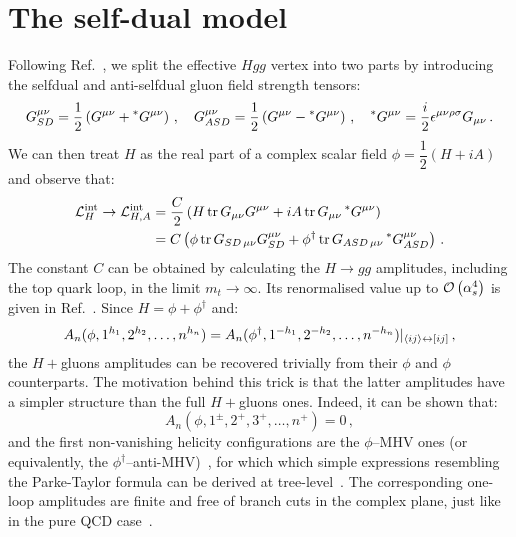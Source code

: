 \documentclass[main.tex]{subfiles}
\begin{document}
\section{The self-dual model}
Following Ref.~\cite{Dixon:2004za}, we split the effective $Hgg$ vertex into two parts by introducing the selfdual and anti-selfdual gluon field strength tensors:
\begin{equation}
    G^{\mu\nu}_{SD} = \frac{1}{2} \left(G^{\mu\nu} + \prescript{\ast}{}{G}^{\mu\nu} \right)\,, \quad     G^{\mu\nu}_{ASD} = \frac{1}{2} \left(G^{\mu\nu} - \prescript{\ast}{}{G}^{\mu\nu} \right)\,, \quad\prescript{\ast}{}{G}^{\mu\nu} = \frac{i}{2} \epsilon^{\mu\nu\rho\sigma} G_{\mu\nu}\,.
\end{equation}
We can then treat $H$ as the real part of a complex scalar field $\phi = \dfrac{1}{2}(H+i A)$ and observe that:
\begin{align}
    \mathcal{L}_H^{\text{int}} \rightarrow \mathcal{L}_{H, A}^{\text{int}} &= \frac{C}{2} \left( H \operatorname{\rm tr} {G}_{\mu\nu}{G}^{\mu\nu} + iA \operatorname{\rm tr} {G}_{\mu\nu}\prescript{\ast}{}{G}^{\mu\nu}\right) \\
    &= C \left( \phi \operatorname{\rm tr} {G}_{SD\,\mu\nu}{G}_{SD}^{\mu\nu} + \phi^\dagger \operatorname{\rm tr} {G}_{ASD\,\mu\nu}\prescript{\ast}{}{G}_{ASD}^{\mu\nu}\right)\,.
\end{align} 
The constant $C$ can be obtained by calculating the $H \rightarrow gg$ amplitudes, including the top quark loop, in the limit $m_t \rightarrow \infty$. Its renormalised value up to $\mathcal{O}\left(\alpha_s^4\right)$ is given in Ref.~\cite{Chetyrkin:1997iv}. Since $H = \phi + \phi^\dagger$ and:
\begin{equation}
    A_n(\phi, 1^{h_1},2^{h_2}, \ldots, n^{h_n}) = A_n(\phi^\dagger, 1^{-h_1},2^{-h_2}, \ldots, n^{-h_n}) \rvert_{\langle ij\rangle \leftrightarrow [ij]} \,,
\end{equation}
the $H+$gluons amplitudes can be recovered trivially from their $\phi$ and $\phi$ counterparts. The motivation behind this trick is that the latter amplitudes have a simpler structure than the full $H+$gluons ones. Indeed, it can be shown that: 
\begin{equation}
    A_n(\phi, 1^\pm,2^+,3^+, \ldots, n^+) = 0 \,,
\end{equation}
and the first non-vanishing helicity configurations are the $\phi$--MHV ones (or equivalently, the $\phi^\dagger$--anti-MHV)~\cite{Berends:1988759}, for which which simple expressions resembling the Parke-Taylor formula can be derived at tree-level~\cite{Dixon:2004za}. The corresponding one-loop amplitudes  are finite and free of branch cuts in the complex plane, just like in the pure QCD case~\cite{Mahlon:1993si}. 
\end{document}
